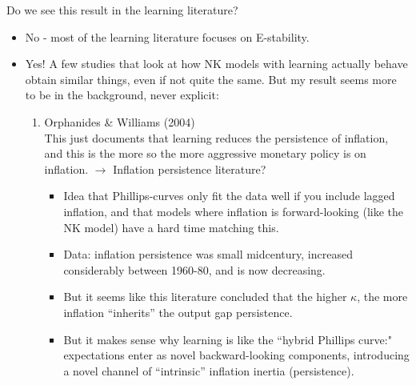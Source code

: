 \documentclass[11pt]{article}
\renewcommand{\[}{\begin{equation}}
\renewcommand{\]}{\end{equation}}
\begin{document}
\begin{enumerate}
	 Do we see this result in the learning literature?
		\begin{itemize}
		\item No - most of the learning literature focuses on E-stability.
		\item Yes! A few studies that look at how NK models with learning actually behave obtain similar things, even if not quite the same. But my result seems more to be in the background, never explicit:
			\begin{enumerate}
			\item Orphanides \& Williams (2004) \\
			This just documents that learning reduces the persistence of inflation, and this is the more so the more aggressive monetary policy is on inflation. $\rightarrow$
			Inflation persistence literature?
			\begin{itemize}
			\item Idea that Phillips-curves only fit the data well if you include lagged inflation, and that models where inflation is forward-looking (like the NK model) have a hard time matching this.
			\item Data: inflation persistence was small midcentury, increased considerably between 1960-80, and is now decreasing. 
			\item But it seems like this literature concluded that the higher $\kappa$, the more inflation ``inherits'' the output gap persistence. 
			\item But it makes sense why learning is like the ``hybrid Phillips curve:" expectations enter as novel backward-looking components, introducing a novel channel of ``intrinsic'' inflation inertia (persistence).
			\end{itemize}


\end{enumerate}
\end{itemize}
\end{enumerate}
\end{document}
